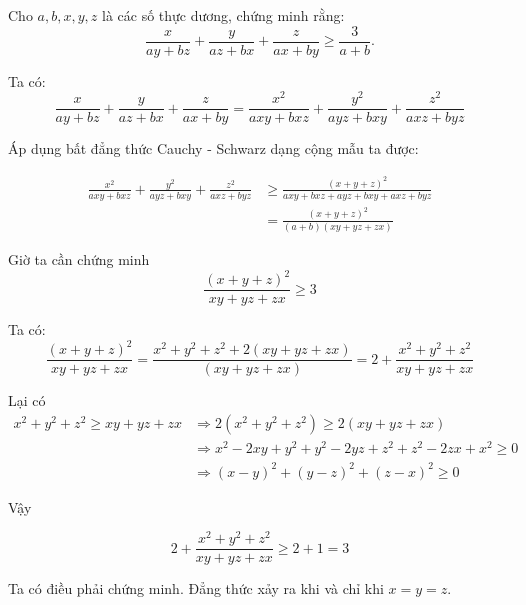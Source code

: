 \begin{problem}
	Cho $a, b, x, y, z$ là các số thực dương, chứng minh rằng:
	$$
		\frac{x}{ay + bz} + \frac{y}{az + bx} + \frac{z}{ax + by} \ge \frac{3}{a + b}.
	$$

\solution

Ta có:
$$
	\frac{x}{ay + bz} + \frac{y}{az + bx} + \frac{z}{ax + by}
	= \frac{x^2}{axy + bxz} + \frac{y^2}{ayz + bxy} + \frac{z^2}{axz + byz}
$$

Áp dụng bất đẳng thức Cauchy - Schwarz dạng cộng mẫu ta được:

\begin{align*}
	\frac{x^2}{axy + bxz} + \frac{y^2}{ayz + bxy} + \frac{z^2}{axz + byz} &\ge 
	\frac{(x + y + z)^2}{axy + bxz + ayz + bxy + axz + byz} \\ &= 
	\frac{(x + y + z)^2}{(a + b)(xy + yz + zx)}
\end{align*}

Giờ ta cần chứng minh 
$$\frac{(x + y + z)^2}{xy + yz + zx} \ge 3$$

Ta có:
$$\frac{(x + y + z)^2}{xy + yz + zx} = \frac{x^2 + y^2 + z^2 + 2(xy + yz + zx)}{(xy + yz + zx)}
= 2 + \frac{x^2 + y^2 + z^2}{xy + yz + zx}$$

Lại có 
\begin{align*}
x^2 + y^2 + z^2 \ge xy + yz + zx 
&\Rightarrow 2(x^2 + y^2 + z^2) \ge 2(xy + yz + zx) \\
&\Rightarrow x^2 - 2xy + y^2 + y^2 - 2yz + z^2 + z^2 - 2zx + x^2 \ge 0 \\
&\Rightarrow (x - y)^2 + (y - z)^2 + (z - x)^2 \ge 0 \tag{luôn đúng} 
\end{align*}

Vậy 

$$2 + \frac{x^2 + y^2 + z^2}{xy + yz + zx} \ge 2 + 1 = 3$$

Ta có điều phải chứng minh. Đẳng thức xảy ra khi và chỉ khi $x = y = z$.
\end{problem}